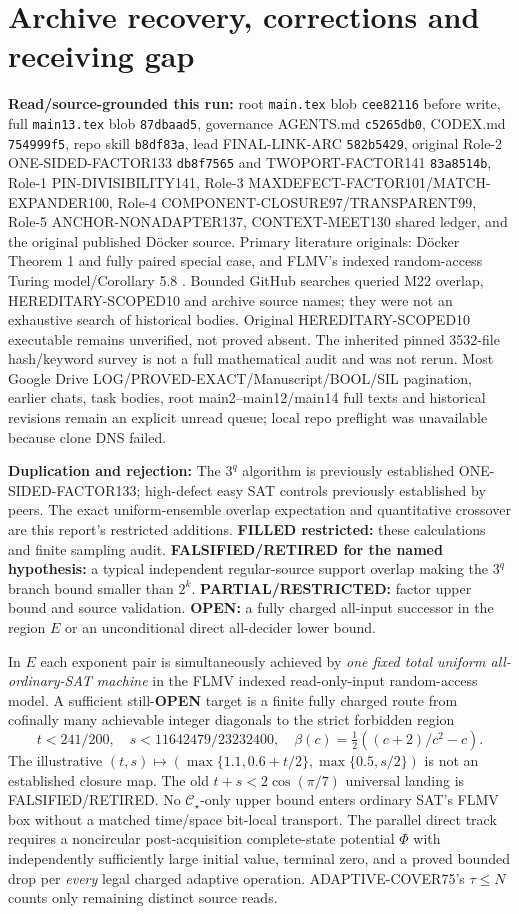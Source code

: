 \documentclass[11pt]{article}
\newcommand{\CS}{\mathcal C_{\star}}
\begin{document}
\section{Archive recovery, corrections and receiving gap}
\textbf{Read/source-grounded this run:} root \texttt{main.tex} blob \texttt{cee82116} before write, full \texttt{main13.tex} blob \texttt{87dbaad5}, governance AGENTS.md \texttt{c5265db0}, CODEX.md \texttt{754999f5}, repo skill \texttt{b8df83a}, lead FINAL-LINK-ARC \texttt{582b5429}, original Role-2 ONE-SIDED-FACTOR133 \texttt{db8f7565} and TWOPORT-FACTOR141 \texttt{83a8514b}, Role-1 PIN-DIVISIBILITY141, Role-3 MAXDEFECT-FACTOR101/MATCH-EXPANDER100, Role-4 COMPONENT-CLOSURE97/TRANSPARENT99, Role-5 ANCHOR-NONADAPTER137, CONTEXT-MEET130 shared ledger, and the original published Döcker source. Primary literature originals: Döcker Theorem 1 and fully paired special case, and FLMV's indexed random-access Turing model/Corollary 5.8 \cite{docker,flmv}. Bounded GitHub searches queried M22 overlap, HEREDITARY-SCOPED10 and archive source names; they were not an exhaustive search of historical bodies. Original HEREDITARY-SCOPED10 executable remains unverified, not proved absent. The inherited pinned 3532-file hash/keyword survey is not a full mathematical audit and was not rerun. Most Google Drive LOG/PROVED-EXACT/Manuscript/BOOL/SIL pagination, earlier chats, task bodies, root main2--main12/main14 full texts and historical revisions remain an explicit unread queue; local repo preflight was unavailable because clone DNS failed.

\textbf{Duplication and rejection:} The $3^q$ algorithm is previously established ONE-SIDED-FACTOR133; high-defect easy SAT controls previously established by peers. The exact uniform-ensemble overlap expectation and quantitative crossover are this report's restricted additions. \textbf{FILLED restricted:} these calculations and finite sampling audit. \textbf{FALSIFIED/RETIRED for the named hypothesis:} a typical independent regular-source support overlap making the $3^q$ branch bound smaller than $2^k$. \textbf{PARTIAL/RESTRICTED:} factor upper bound and source validation. \textbf{OPEN:} a fully charged all-input successor in the region $E$ or an unconditional direct all-decider lower bound.

In $E$ each exponent pair is simultaneously achieved by \emph{one fixed total uniform all-ordinary-SAT machine} in the FLMV indexed read-only-input random-access model. A sufficient still-\textbf{OPEN} target is a finite fully charged route from cofinally many achievable integer diagonals to the strict forbidden region
\[
t<241/200,\quad s<11642479/23232400,\quad
\beta(c)=\tfrac12((c+2)/c^2-c).
\]
The illustrative $(t,s)\mapsto(\max\{1.1,0.6+t/2\},\max\{0.5,s/2\})$ is not an established closure map. The old $t+s<2\cos(\pi/7)$ universal landing is FALSIFIED/RETIRED. No $\CS$-only upper bound enters ordinary SAT's FLMV box without a matched time/space bit-local transport. The parallel direct track requires a noncircular post-acquisition complete-state potential $\Phi$ with independently sufficiently large initial value, terminal zero, and a proved bounded drop per \emph{every} legal charged adaptive operation. ADAPTIVE-COVER75's $\tau\le N$ counts only remaining distinct source reads.
\end{document}
